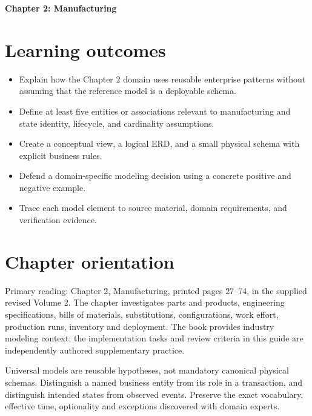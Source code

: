 \documentclass[11pt,letterpaper]{article}
\begin{document}
\begin{center}
{\LARGE\bfseries\color{navy} Chapter 2: Manufacturing}\par
\vspace{0.25em}{\large Study guide | concept, critique, design, verify}\par
{}
\end{center}
\vspace{0.8em}
\section{Learning outcomes}
\begin{itemize}
\item Explain how the Chapter 2 domain uses reusable enterprise patterns without assuming that the reference model is a deployable schema.
\item Define at least five entities or associations relevant to manufacturing and state identity, lifecycle, and cardinality assumptions.
\item Create a conceptual view, a logical ERD, and a small physical schema with explicit business rules.
\item Defend a domain-specific modeling decision using a concrete positive and negative example.
\item Trace each model element to source material, domain requirements, and verification evidence.
\end{itemize}

\section{Chapter orientation}
Primary reading: Chapter 2, Manufacturing, printed pages 27--74, in the supplied revised Volume 2. The chapter investigates parts and products, engineering specifications, bills of materials, substitutions, configurations, work effort, production runs, inventory and deployment. The book provides industry modeling context; the implementation tasks and review criteria in this guide are independently authored supplementary practice.

Universal models are reusable hypotheses, not mandatory canonical physical schemas. Distinguish a named business entity from its role in a transaction, and distinguish intended states from observed events. Preserve the exact vocabulary, effective time, optionality and exceptions discovered with domain experts.
\end{document}
